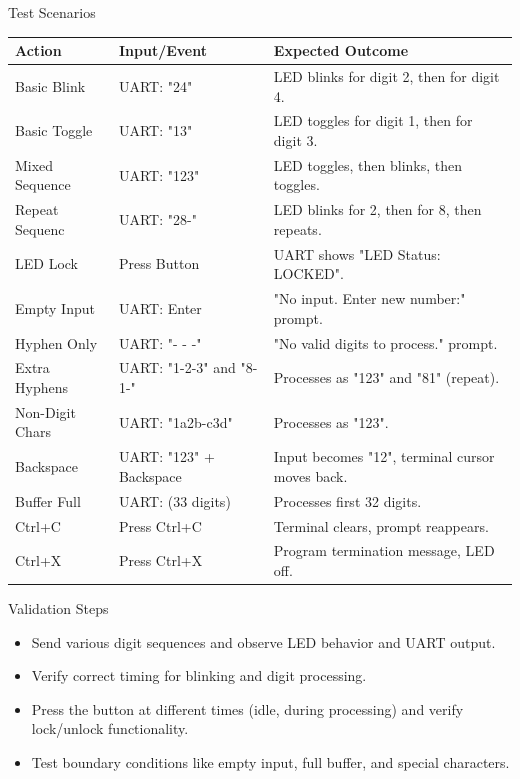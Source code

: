 \documentclass[12pt,a4paper]{article}
\begin{document}
\begin{mytitledbox}{Test Scenarios }
\begin{tabular}{@{}p{}p{}p{}@{}}
\toprule[1.5pt]
\textbf{\textcolor{myblue}{Action}} & \textbf{\textcolor{myblue}{Input/Event}} & \textbf{\textcolor{myblue}{Expected Outcome}} \\
\midrule[0.8pt]
Basic Blink    & UART: "24" & LED blinks for digit 2, then for digit 4. \\
\rowcolor{lightbluegray!55} Basic Toggle   & UART: "13" & LED toggles for digit 1, then for digit 3. \\
Mixed Sequence & UART: "123" & LED toggles, then blinks, then toggles. \\
\rowcolor{lightbluegray!55} Repeat Sequenc & UART: "28-" & LED blinks for 2, then for 8, then repeats. \\
LED Lock       & Press Button       & UART shows "LED Status: LOCKED". \\
\rowcolor{lightbluegray!55} Empty Input    & UART: Enter        & "No input. Enter new number:" prompt. \\
Hyphen Only    & UART: "- - -" & "No valid digits to process." prompt. \\
\rowcolor{lightbluegray!55} Extra Hyphens & UART: "1-2-3" and "8-1-" & Processes as "123" and "81" (repeat). \\
Non-Digit Chars & UART: "1a2b-c3d" & Processes as "123". \\
\rowcolor{lightbluegray!55} Backspace      & UART: "123" + Backspace & Input becomes "12", terminal cursor moves back. \\
Buffer Full    & UART: (33 digits)  & Processes first 32 digits. \\
\rowcolor{lightbluegray!55} Ctrl+C         & Press Ctrl+C       & Terminal clears, prompt reappears. \\
Ctrl+X         & Press Ctrl+X       & Program termination message, LED off. \\

\bottomrule[1.5pt]
\end{tabular}
\end{mytitledbox}

\vspace{1cm}

\begin{mytitledbox}{Validation Steps}
\begin{itemize}[label=\textcolor{myblue}{$\checkmark$}, itemsep=1.5mm]
    \item Send various digit sequences and observe LED behavior and UART output.
    \item Verify correct timing for blinking and digit processing.
    \item Press the button at different times (idle, during processing) and verify lock/unlock functionality.
    \item Test boundary conditions like empty input, full buffer, and special characters.
\end{itemize}
\end{mytitledbox}
\end{document}
